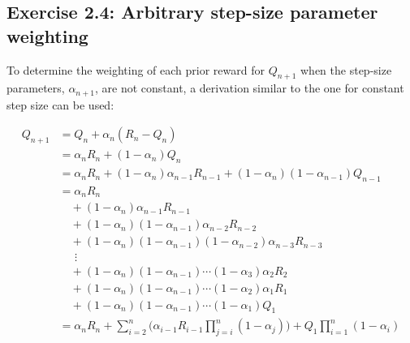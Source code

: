 \subsection*{Exercise 2.4: Arbitrary step-size parameter weighting}

To determine the weighting of each prior reward for $Q_{n+1}$ when the step-size parameters, $\alpha_{n+1}$, are not constant, a derivation similar to the one for constant step size can be used:

\vspace{-6mm}
\begin{align*}
Q_{n+1} &= Q_n + \alpha_n(R_n - Q_n) \\
&= \alpha_nR_n + (1 - \alpha_n)Q_n \\
&= \alpha_nR_n + (1 - \alpha_n)\alpha_{n-1}R_{n-1} + (1 - \alpha_n)(1-\alpha_{n-1})Q_{n-1} \\
&= \alpha_nR_n \\ 
& \quad + (1 - \alpha_n)\alpha_{n-1}R_{n-1} \\
& \quad + (1 - \alpha_n)(1 - \alpha_{n-1})\alpha_{n-2}R_{n-2} \\
& \quad + (1 - \alpha_n)(1 - \alpha_{n-1})(1 - \alpha_{n-2})\alpha_{n-3}R_{n-3} \\
& \quad \ \, \vdots \\
& \quad + (1 - \alpha_n)(1-\alpha_{n-1}) \cdots (1-\alpha_3)\alpha_2R_2 \\
& \quad + (1 - \alpha_n)(1-\alpha_{n-1}) \cdots (1-\alpha_2)\alpha_1R_1 \\
& \quad + (1 - \alpha_n)(1-\alpha_{n-1}) \cdots (1-\alpha_1)Q_1 \\
&= \alpha_nR_n + \sum_{i=2}^{n}\Big(\alpha_{i-1}R_{i-1}\prod_{j=i}^{n}(1-\alpha_j)\Big) + Q_1\prod_{i=1}^{n}(1-\alpha_i)\\
\end{align*}


